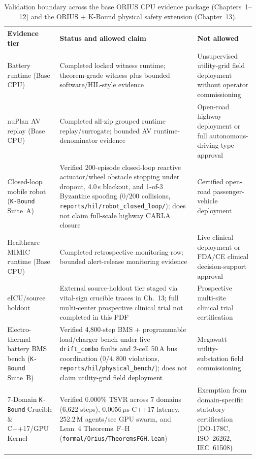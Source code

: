 \begin{table}[t]
\centering
\caption{Validation boundary across the base ORIUS CPU evidence package (Chapters~1--12) and the ORIUS + K-Bound physical safety extension (Chapter~13).}
\label{tab:validation-boundary}
\footnotesize
\renewcommand{\arraystretch}{1.15}
\begin{tabularx}{\textwidth}{p{} p{} X}
\toprule
\textbf{Evidence tier} & \textbf{Status and allowed claim} & \textbf{Not allowed}\\
\midrule
Battery runtime (Base CPU) & Completed locked witness runtime; theorem-grade witness plus bounded software/HIL-style evidence & Unsupervised utility-grid field deployment without operator commissioning\\
nuPlan AV replay (Base CPU) & Completed all-zip grouped runtime replay/surrogate; bounded AV runtime-denominator evidence & Open-road highway deployment or full autonomous-driving type approval\\
Closed-loop mobile robot (\texttt{K-Bound} Suite~A) & Verified 200-episode closed-loop reactive actuator/wheel obstacle stopping under dropout, 4.0\,s blackout, and 1-of-3 Byzantine spoofing ($0/200$ collisions, \texttt{reports/hil/robot\_closed\_loop/}); does not claim full-scale highway CARLA closure & Certified open-road passenger-vehicle deployment\\
Healthcare MIMIC runtime (Base CPU) & Completed retrospective monitoring row; bounded alert-release monitoring evidence & Live clinical deployment or FDA/CE clinical decision-support approval\\
eICU/source holdout & External source-holdout tier staged via vital-sign crucible traces in Ch.~13; full multi-center prospective clinical trial not completed in this PDF & Prospective multi-site clinical trial certification\\
Electro-thermal battery BMS bench (\texttt{K-Bound} Suite~B) & Verified 4,800-step BMS + programmable load/charger bench under live \texttt{drift\_combo} faults and 2-cell 50\,A bus coordination ($0/4{,}800$ violations, \texttt{reports/hil/physical\_bench/}); does not claim utility-grid field deployment & Megawatt utility-substation field commissioning\\
7-Domain \texttt{K-Bound} Crucible \& C++17/GPU Kernel & Verified 0.000\% TSVR across 7 domains (6,622 steps), 0.0056\,$\mu$s C++17 latency, 252.2\,M agents/sec GPU swarm, and Lean~4 Theorems~F--H (\texttt{formal/Orius/TheoremsFGH.lean}) & Exemption from domain-specific statutory certification (DO-178C, ISO~26262, IEC~61508)\\
\bottomrule
\end{tabularx}
\end{table}
